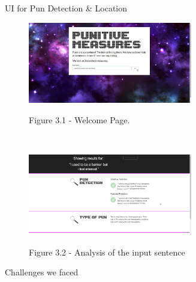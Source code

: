 \documentclass[final]{beamer}
\newlength{\sepwid}
\newlength{\onecolwid}
\newlength{\twocolwid}
\begin{document}
\begin{frame}[t]
\begin{columns}[t]
\begin{column}{\twocolwid}
\begin{columns}[t,totalwidth=\twocolwid]
\begin{column}{\onecolwid}
\end{column} %

\end{columns} %

\end{column} %

\begin{column}{\sepwid}\end{column} %


    \begin{column}{\sepwid}\end{column}			%
    \begin{column}{\onecolwid}
            
\begin{block}{UI for Pun Detection \& Location}
\begin{figure}
\centering
\includegraphics[width=0.75\textwidth]{UI_1.jpg}\\
\caption{Figure 3.1 - Welcome Page.}
\end{figure}
\\
\vspace{10mm}
\begin{figure}
\centering
\includegraphics[width=0.75\textwidth]{UI_2.png}\\
\centering
\caption{Figure 3.2 - Analysis of the input sentence}
\end{figure}
\end{block}
\vspace{20mm}
            \begin{block}{Challenges we faced}
                    

\end{block}
\end{column}
\end{columns}
\end{frame}
\end{document}

